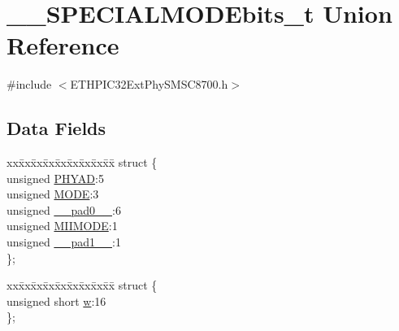 \hypertarget{union_____s_p_e_c_i_a_l_m_o_d_ebits__t}{}\section{\+\_\+\+\_\+\+S\+P\+E\+C\+I\+A\+L\+M\+O\+D\+Ebits\+\_\+t Union Reference}
\label{union_____s_p_e_c_i_a_l_m_o_d_ebits__t}


{\ttfamily \#include $<$E\+T\+H\+P\+I\+C32\+Ext\+Phy\+S\+M\+S\+C8700.\+h$>$}

\subsection*{Data Fields}
\begin{DoxyCompactItemize}
\item 
\begin{tabbing}
xx\=xx\=xx\=xx\=xx\=xx\=xx\=xx\=xx\=\kill
struct \{\\
\>unsigned \hyperlink{union_____s_p_e_c_i_a_l_m_o_d_ebits__t_ad7512c2f25e7ba0954f5da603b8d1997}{PHYAD}:5\\
\>unsigned \hyperlink{union_____s_p_e_c_i_a_l_m_o_d_ebits__t_adc56ba18ff3f1599c85d222bee624424}{MODE}:3\\
\>unsigned \hyperlink{union_____s_p_e_c_i_a_l_m_o_d_ebits__t_adf71f3d8410c1f1dbbc96680a92c49af}{\_\_pad0\_\_}:6\\
\>unsigned \hyperlink{union_____s_p_e_c_i_a_l_m_o_d_ebits__t_a0dcd5bec09cb7e7d22482b1577e78302}{MIIMODE}:1\\
\>unsigned \hyperlink{union_____s_p_e_c_i_a_l_m_o_d_ebits__t_acaf2d0924a107ec6e8d2e31febaf66f9}{\_\_pad1\_\_}:1\\
\}; \\

\end{tabbing}\item 
\begin{tabbing}
xx\=xx\=xx\=xx\=xx\=xx\=xx\=xx\=xx\=\kill
struct \{\\
\>unsigned short \hyperlink{union_____s_p_e_c_i_a_l_m_o_d_ebits__t_a160850a4684a3e82c2323033964f2e98}{w}:16\\
\}; \\


\end{tabbing}
\end{DoxyCompactItemize}

